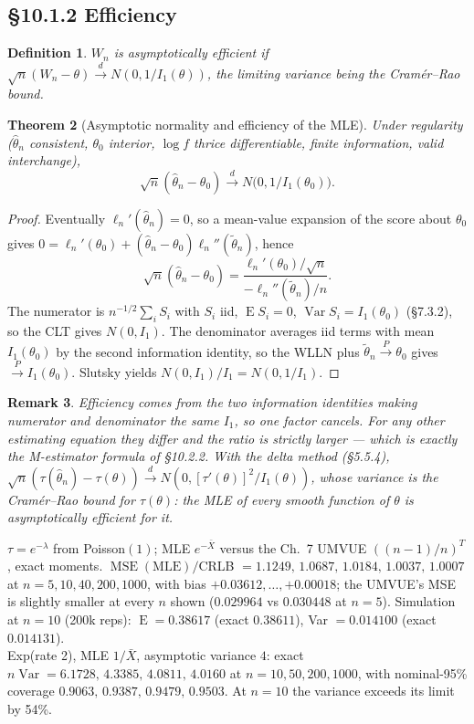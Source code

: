 \documentclass[11pt]{article}
\newtheorem{theorem}{Theorem}[section]
\newtheorem{definition}[theorem]{Definition}
\newtheorem{remark}[theorem]{Remark}
\DeclareMathOperator{\Var}{Var}\DeclareMathOperator{\E}{E}
\DeclareMathOperator{\MSE}{MSE}
\newcommand{\convP}{\xrightarrow{P}}\newcommand{\convD}{\xrightarrow{d}}
\begin{document}
\subsection{\S10.1.2 Efficiency}
\begin{definition}
$W_n$ is asymptotically efficient if $\sqrt n(W_n-\theta)\convD N(0,1/I_1(\theta))$, the limiting variance being the Cram\'er--Rao bound.
\end{definition}
\begin{theorem}[Asymptotic normality and efficiency of the MLE]
Under regularity ($\hat\theta_n$ consistent, $\theta_0$ interior, $\log f$ thrice differentiable, finite information, valid interchange),
\[\sqrt n(\hat\theta_n-\theta_0)\convD N\big(0,1/I_1(\theta_0)\big).\]
\end{theorem}
\begin{proof}
Eventually $\ell_n'(\hat\theta_n)=0$, so a mean-value expansion of the score about $\theta_0$ gives $0=\ell_n'(\theta_0)+(\hat\theta_n-\theta_0)\ell_n''(\tilde\theta_n)$, hence
\[\sqrt n(\hat\theta_n-\theta_0)=\frac{\ell_n'(\theta_0)/\sqrt n}{-\ell_n''(\tilde\theta_n)/n}.\]
The numerator is $n^{-1/2}\sum_iS_i$ with $S_i$ iid, $\E S_i=0$, $\Var S_i=I_1(\theta_0)$ (\S7.3.2), so the CLT gives $N(0,I_1)$. The denominator averages iid terms with mean $I_1(\theta_0)$ by the second information identity, so the WLLN plus $\tilde\theta_n\convP\theta_0$ gives $\convP I_1(\theta_0)$. Slutsky yields $N(0,I_1)/I_1=N(0,1/I_1)$.
\end{proof}
\begin{remark}
Efficiency comes from the two information identities making numerator and denominator the same $I_1$, so one factor cancels. For any other estimating equation they differ and the ratio is strictly larger --- which is exactly the M-estimator formula of \S10.2.2. With the delta method (\S5.5.4), $\sqrt n(\tau(\hat\theta_n)-\tau(\theta))\convD N(0,[\tau'(\theta)]^2/I_1(\theta))$, whose variance is the Cram\'er--Rao bound for $\tau(\theta)$: the MLE of every smooth function of $\theta$ is asymptotically efficient for it.
\end{remark}
\begin{simbox}
$\tau=e^{-\lambda}$ from Poisson$(1)$; MLE $e^{-\bar X}$ versus the Ch.\ 7 UMVUE $((n-1)/n)^T$, exact moments. $\MSE(\text{MLE})/$CRLB $=1.1249,\,1.0687,\,1.0184,\,1.0037,\,1.0007$ at $n=5,10,40,200,1000$, with bias $+0.03612,\ldots,+0.00018$; the UMVUE's MSE is slightly smaller at every $n$ shown ($0.029964$ vs $0.030448$ at $n=5$). Simulation at $n=10$ (200k reps): $\E=0.38617$ (exact $0.38611$), Var $=0.014100$ (exact $0.014131$).\\
Exp(rate 2), MLE $1/\bar X$, asymptotic variance $4$: exact $n\Var=6.1728,\,4.3385,\,4.0811,\,4.0160$ at $n=10,50,200,1000$, with nominal-95\% coverage $0.9063,\,0.9387,\,0.9479,\,0.9503$. At $n=10$ the variance exceeds its limit by 54\%.
\end{simbox}
\end{document}
